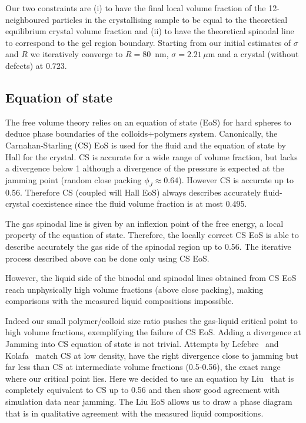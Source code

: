 Our two constraints are (i) to have the final local volume fraction of the 12-neighboured particles in the crystallising sample to be equal to the theoretical equilibrium crystal volume fraction and (ii) to have the theoretical spinodal line to correspond to the gel region boundary. Starting from our initial estimates of $\sigma$ and $R$ we iteratively converge to $R=80$~nm, $\sigma = 2.21\,\mu$m and a crystal (without defects) at $0.723$.

\subsection*{Equation of state}

The free volume theory relies on an equation of state (EoS) for hard spheres to deduce phase boundaries of the colloids+polymers system. Canonically, the Carnahan-Starling (CS) EoS is used for the fluid and the equation of state by Hall for the crystal. CS is accurate for a wide range of volume fraction, but lacks a divergence below 1 although a divergence of the pressure is expected at the jamming point (random close packing $\phi_J\approx 0.64$). However CS is accurate up to 0.56. Therefore CS (coupled will Hall EoS) always describes accurately fluid-crystal coexistence since the fluid volume fraction is at most 0.495.

The gas spinodal line is given by an inflexion point of the free energy, a local property of the equation of state. Therefore, the locally correct CS EoS is able to describe accurately the gas side of the spinodal region up to 0.56. The iterative process described above can be done only using CS EoS.

However, the liquid side of the binodal and spinodal lines obtained from CS EoS reach unphysically high volume fractions (above close packing), making comparisons with the measured liquid compositions impossible.

Indeed our small polymer/colloid size ratio pushes the gas-liquid critical point to high volume fractions, exemplifying the failure of CS EoS. Adding a divergence at Jamming into CS equation of state is not trivial. Attempts by Lefebre~\cite{LeFevre1972} and Kolafa~\cite{Kolafa2004} match CS at low density, have the right divergence close to jamming but far less than CS at intermediate volume fractions (0.5-0.56), the exact range where our critical point lies. Here we decided to use an equation by Liu~\cite{Liu2006a} that is completely equivalent to CS up to 0.56 and then show good agreement with simulation data near jamming.
%
The Liu EoS allows us to draw a phase diagram that is in qualitative agreement with the measured liquid compositions.

